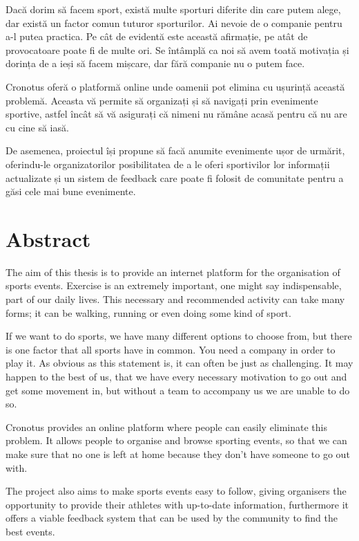 Dacă dorim să facem sport, există multe sporturi diferite din care putem alege, dar există un factor comun tuturor sporturilor. Ai nevoie de o companie pentru a-l putea practica. Pe cât de evidentă este această afirmație, pe atât de provocatoare poate fi de multe ori. Se întâmplă ca noi să avem toată motivația și dorința de a ieși să facem mișcare, dar fără companie nu o putem face.

Cronotus oferă o platformă online unde oamenii pot elimina cu ușurință această problemă. Aceasta vă permite să organizați și să navigați prin evenimente sportive, astfel încât să vă asigurați că nimeni nu rămâne acasă pentru că nu are cu cine să iasă.

De asemenea, proiectul își propune să facă anumite evenimente ușor de urmărit, oferindu-le organizatorilor posibilitatea de a le oferi sportivilor lor informații actualizate și un sistem de feedback care poate fi folosit de comunitate pentru a găsi cele mai bune evenimente.


\vfill
{}

\chapter*{Abstract}

The aim of this thesis is to provide an internet platform for the organisation of sports events. Exercise is an extremely important, one might say indispensable, part of our daily lives. This necessary and recommended activity can take many forms; it can be walking, running or even doing some kind of sport.

If we want to do sports, we have many different options to choose from, but there is one factor that all sports have in common. You need a company in order to play it. As obvious as this statement is, it can often be just as challenging. It may happen to the best of us, that we have every necessary motivation to go out and get some movement in, but without a team to accompany us we are unable to do so.

Cronotus provides an online platform where people can easily eliminate this problem. It allows people to organise and browse sporting events, so that we can make sure that no one is left at home because they don't have someone to go out with.

The project also aims to make sports events easy to follow, giving organisers the opportunity to provide their athletes with up-to-date information, furthermore it offers a viable feedback system that can be used by the community to find the best events.

\vfill
\dolgozatnyelve
{}